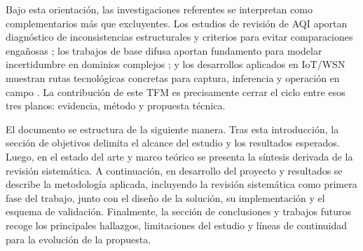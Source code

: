 Bajo esta orientación, las investigaciones referentes se interpretan como complementarios más que excluyentes. Los estudios de revisión de AQI aportan diagnóstico de inconsistencias estructurales y criterios para evitar comparaciones engañosas \cite{ART01,ART02}; los trabajos de base difusa aportan fundamento para modelar incertidumbre en dominios complejos \cite{ART03}; y los desarrollos aplicados en IoT/WSN muestran rutas tecnológicas concretas para captura, inferencia y operación en campo \cite{ART04,ART05,ART06,ART07,ART08}. La contribución de este TFM es precisamente cerrar el ciclo entre esos tres planos: evidencia, método y propuesta técnica.

El documento se estructura de la siguiente manera. Tras esta introducción, la sección de objetivos delimita el alcance del estudio y los resultados esperados. Luego, en el estado del arte y marco teórico se presenta la síntesis derivada de la revisión sistemática. A continuación, en desarrollo del proyecto y resultados se describe la metodología aplicada, incluyendo la revisión sistemática como primera fase del trabajo, junto con el diseño de la solución, su implementación y el esquema de validación. Finalmente, la sección de conclusiones y trabajos futuros recoge los principales hallazgos, limitaciones del estudio y líneas de continuidad para la evolución de la propuesta.
